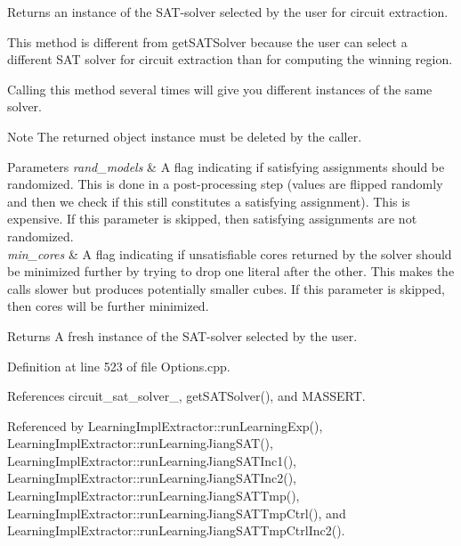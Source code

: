 Returns an instance of the S\-A\-T-\/solver selected by the user for circuit extraction. 

This method is different from get\-S\-A\-T\-Solver because the user can select a different S\-A\-T solver for circuit extraction than for computing the winning region.

Calling this method several times will give you different instances of the same solver.

\begin{DoxyNote}{Note}
The returned object instance must be deleted by the caller. 
\end{DoxyNote}

\begin{DoxyParams}{Parameters}
{\em rand\-\_\-models} & A flag indicating if satisfying assignments should be randomized. This is done in a post-\/processing step (values are flipped randomly and then we check if this still constitutes a satisfying assignment). This is expensive. If this parameter is skipped, then satisfying assignments are not randomized. \\
\hline
{\em min\-\_\-cores} & A flag indicating if unsatisfiable cores returned by the solver should be minimized further by trying to drop one literal after the other. This makes the calls slower but produces potentially smaller cubes. If this parameter is skipped, then cores will be further minimized. \\
\hline
\end{DoxyParams}
\begin{DoxyReturn}{Returns}
A fresh instance of the S\-A\-T-\/solver selected by the user. 
\end{DoxyReturn}


Definition at line 523 of file Options.\-cpp.



References circuit\-\_\-sat\-\_\-solver\-\_\-, get\-S\-A\-T\-Solver(), and M\-A\-S\-S\-E\-R\-T.



Referenced by Learning\-Impl\-Extractor\-::run\-Learning\-Exp(), Learning\-Impl\-Extractor\-::run\-Learning\-Jiang\-S\-A\-T(), Learning\-Impl\-Extractor\-::run\-Learning\-Jiang\-S\-A\-T\-Inc1(), Learning\-Impl\-Extractor\-::run\-Learning\-Jiang\-S\-A\-T\-Inc2(), Learning\-Impl\-Extractor\-::run\-Learning\-Jiang\-S\-A\-T\-Tmp(), Learning\-Impl\-Extractor\-::run\-Learning\-Jiang\-S\-A\-T\-Tmp\-Ctrl(), and Learning\-Impl\-Extractor\-::run\-Learning\-Jiang\-S\-A\-T\-Tmp\-Ctrl\-Inc2().


